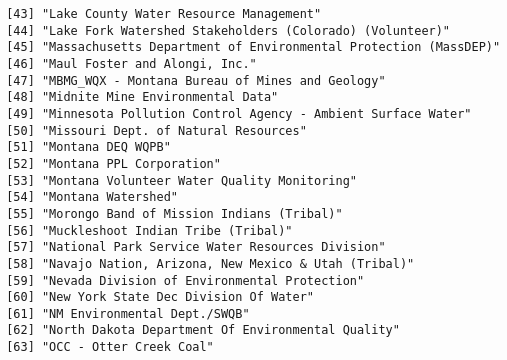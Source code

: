 \documentclass[
  12pt,
]{article}
\begin{document}
\begin{verbatim}
 [43] "Lake County Water Resource Management"                                                                                
 [44] "Lake Fork Watershed Stakeholders (Colorado) (Volunteer)"                                                              
 [45] "Massachusetts Department of Environmental Protection (MassDEP)"                                                       
 [46] "Maul Foster and Alongi, Inc."                                                                                         
 [47] "MBMG_WQX - Montana Bureau of Mines and Geology"                                                                       
 [48] "Midnite Mine Environmental Data"                                                                                      
 [49] "Minnesota Pollution Control Agency - Ambient Surface Water"                                                           
 [50] "Missouri Dept. of Natural Resources"                                                                                  
 [51] "Montana DEQ WQPB"                                                                                                     
 [52] "Montana PPL Corporation"                                                                                              
 [53] "Montana Volunteer Water Quality Monitoring"                                                                           
 [54] "Montana Watershed"                                                                                                    
 [55] "Morongo Band of Mission Indians (Tribal)"                                                                             
 [56] "Muckleshoot Indian Tribe (Tribal)"                                                                                    
 [57] "National Park Service Water Resources Division"                                                                       
 [58] "Navajo Nation, Arizona, New Mexico & Utah (Tribal)"                                                                   
 [59] "Nevada Division of Environmental Protection"                                                                          
 [60] "New York State Dec Division Of Water"                                                                                 
 [61] "NM Environmental Dept./SWQB"                                                                                          
 [62] "North Dakota Department Of Environmental Quality"                                                                     
 [63] "OCC - Otter Creek Coal"                                                                                               

\end{verbatim}
\end{document}
